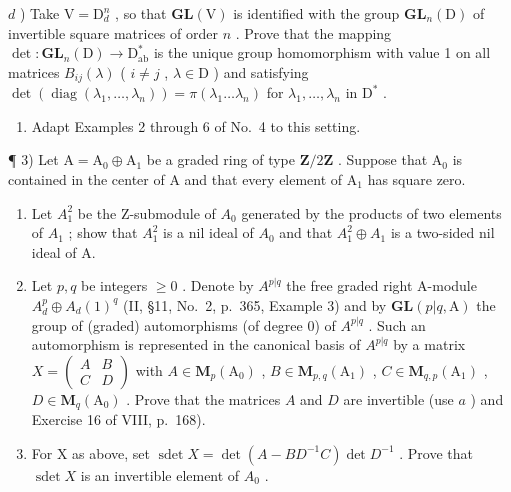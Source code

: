\(d\) ) Take \(\mathrm{V} = \mathrm{D}_d^n\) , so that \(\mathbf{GL}(\mathrm{V})\) is identified with the group \(\mathbf{GL}_n(\mathrm{D})\) of invertible square matrices of order \(n\) . Prove that the mapping \(\operatorname{det}:\mathbf{GL}_n(\mathrm{D})\to \mathrm{D}_{\mathrm{ab}}^*\) is the unique group homomorphism with value 1 on all matrices \(B_{ij}(\lambda)\) ( \(i\neq j\) , \(\lambda \in \mathrm{D}\) ) and satisfying \(\operatorname{det}(\operatorname{diag}(\lambda_1,\dots ,\lambda_n)) = \pi (\lambda_1\dots \lambda_n)\) for \(\lambda_1,\ldots ,\lambda_n\) in \(\mathrm{D}^*\) .

\begin{enumerate}
\def\labelenumi{\alph{enumi})}
\setcounter{enumi}{4}
\tightlist
\item
  Adapt Examples 2 through 6 of No.~4 to this setting.
\end{enumerate}

¶ 3) Let \(\mathrm{A} = \mathrm{A}_0 \oplus \mathrm{A}_1\) be a graded ring of type \(\mathbf{Z}/2\mathbf{Z}\) . Suppose that \(\mathrm{A}_0\) is contained in the center of \(\mathrm{A}\) and that every element of \(\mathrm{A}_1\) has square zero.

\begin{enumerate}
\def\labelenumi{\alph{enumi})}
\item
  Let \(A_{1}^{2}\) be the Z-submodule of \(A_{0}\) generated by the products of two elements of \(A_{1}\) ; show that \(A_{1}^{2}\) is a nil ideal of \(A_{0}\) and that \(A_{1}^{2} \oplus A_{1}\) is a two-sided nil ideal of A.
\item
  Let \(p, q\) be integers \(\geqslant 0\) . Denote by \(A^{p|q}\) the free graded right A-module \(A_d^p \oplus A_d(1)^q\) (II, §11, No.~2, p.~365, Example 3) and by \(\mathbf{GL}(p|q, \mathrm{A})\) the group of (graded) automorphisms (of degree 0) of \(A^{p|q}\) . Such an automorphism is represented in the canonical basis of \(A^{p|q}\) by a matrix \(X = \begin{pmatrix} A & B \\ C & D \end{pmatrix}\) with \(A \in \mathbf{M}_p(\mathrm{A}_0)\) , \(B \in \mathbf{M}_{p,q}(\mathrm{A}_1)\) , \(C \in \mathbf{M}_{q,p}(\mathrm{A}_1)\) , \(D \in \mathbf{M}_q(\mathrm{A}_0)\) . Prove that the matrices \(A\) and \(D\) are invertible (use \(a\) ) and Exercise 16 of VIII, p.~168).
\item
  For X as above, set \(\operatorname{sdet} X = \det(A - BD^{-1}C) \det D^{-1}\) . Prove that \(\operatorname{sdet} X\) is an invertible element of \(A_{0}\) .
\end{enumerate}

